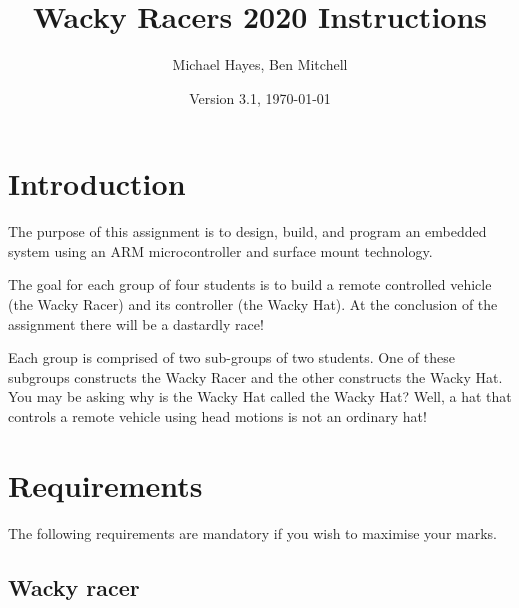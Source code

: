 \documentclass[11pt, a4paper]{article}
\title{Wacky Racers 2020 Instructions}
\author{Michael Hayes, Ben Mitchell}
\date{Version 3.1, \today}
\begin{document}
\maketitle

\section{Introduction}

The purpose of this assignment is to design, build, and program an
embedded system using an ARM microcontroller and surface mount
technology.

The goal for each group of four students is to build a remote
controlled vehicle (the Wacky Racer) and its controller (the Wacky
Hat).  At the conclusion of the assignment there will be a dastardly race!

Each group is comprised of two sub-groups of two students.  One of
these subgroups constructs the Wacky Racer and the other constructs
the Wacky Hat.  You may be asking why is the Wacky Hat called the
Wacky Hat?  Well, a hat that controls a remote vehicle using head
motions is not an ordinary hat!


\section{Requirements}

The following requirements are mandatory if you wish to maximise your
marks.


\subsection{Wacky racer}
\end{document}
